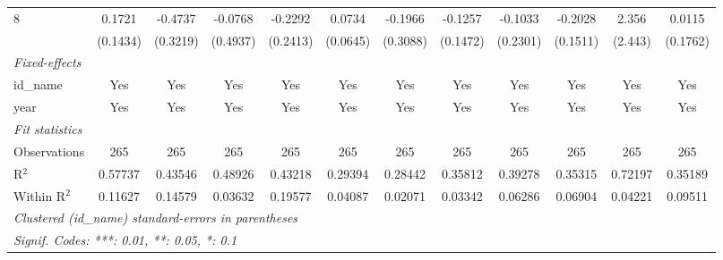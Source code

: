 \begin{adjustbox}{width=650}
\begin{tabular}{lccccccccccc}
    8     & 0.1721   & -0.4737              & -0.0768                    & -0.2292       & 0.0734                        & -0.1966                     & -0.1257               & -0.1033          & -0.2028       & 2.356       & 0.0115\\   
                                            & (0.1434) & (0.3219)             & (0.4937)                   & (0.2413)      & (0.0645)                      & (0.3088)                    & (0.1472)              & (0.2301)         & (0.1511)      & (2.443)     & (0.1762)\\   
   \midrule
   \emph{Fixed-effects}\\
   id\_name                                 & Yes      & Yes                  & Yes                        & Yes           & Yes                           & Yes                         & Yes                   & Yes              & Yes           & Yes         & Yes\\  
   year                                     & Yes      & Yes                  & Yes                        & Yes           & Yes                           & Yes                         & Yes                   & Yes              & Yes           & Yes         & Yes\\  
   \midrule
   \emph{Fit statistics}\\
   Observations                             & 265      & 265                  & 265                        & 265           & 265                           & 265                         & 265                   & 265              & 265           & 265         & 265\\  
   R$^2$                                    & 0.57737  & 0.43546              & 0.48926                    & 0.43218       & 0.29394                       & 0.28442                     & 0.35812               & 0.39278          & 0.35315       & 0.72197     & 0.35189\\  
   Within R$^2$                             & 0.11627  & 0.14579              & 0.03632                    & 0.19577       & 0.04087                       & 0.02071                     & 0.03342               & 0.06286          & 0.06904       & 0.04221     & 0.09511\\  
   \midrule \midrule
   \multicolumn{12}{l}{\emph{Clustered (id\_name) standard-errors in parentheses}}\\
   \multicolumn{12}{l}{\emph{Signif. Codes: ***: 0.01, **: 0.05, *: 0.1}}\\
\end{tabular}
\end{adjustbox}
\par\endgroup